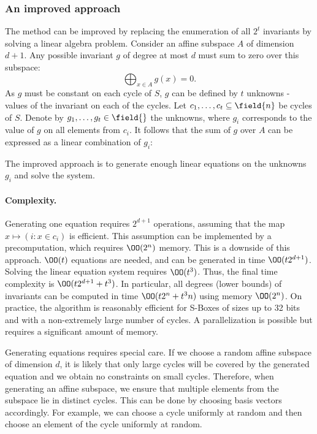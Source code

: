 \subsubsection{An improved approach}
The method can be improved by replacing the enumeration of all $2^t$ invariants by solving a linear algebra problem. Consider an affine subspace $A$ of dimension $d+1$. Any possible invariant $g$ of degree at most $d$ must sum to zero over this subspace:
$$
\bigoplus_{x \in A} g(x) = 0.
$$
As $g$ must be constant on each cycle of $S$, $g$ can be defined by $t$ unknowns - values of the invariant on each of the cycles. Let $c_1, \ldots, c_t \subseteq \field{n}$ be cycles of $S$. Denote by $g_1, \ldots, g_t \in \field{}$ the unknowns, where $g_i$ corresponds to the value of $g$ on all elements from $c_i$. It follows that the sum of $g$ over $A$ can be expressed as a linear combination of $g_i$:

The improved approach is to generate enough linear equations on the unknowns $g_i$ and solve the system.

\paragraph{Complexity.}
Generating one equation requires $2^{d+1}$ operations, assuming that the map $x \mapsto (i: x \in c_i)$ is efficient. This assumption can be implemented by a precomputation, which requires $\OO(2^n)$ memory. This is a downside of this approach. 
$\OO(t)$ equations are needed, and can be generated in time $\OO(t2^{d+1})$. Solving the linear equation system requires $\OO(t^3)$. Thus, the final time complexity is $\OO(t2^{d+1} + t^3)$. In particular, all degrees (lower bounds) of invariants can be computed in time $\OO(t2^n + t^3n)$ using memory $\OO(2^n)$. On practice, the algorithm is reasonably efficient for S-Boxes of sizes up to 32 bits and with a non-extremely large number of cycles. A parallelization is possible but requires a significant amount of memory.

\begin{remark}
Generating equations requires special care. If we choose a random affine subspace of dimension $d$, it is likely that only large cycles will be covered by the generated equation and we obtain no constraints on small cycles. Therefore, when generating an affine subspace, we ensure that multiple elements from the subspace lie in distinct cycles. This can be done by choosing basis vectors accordingly. For example, we can choose a cycle uniformly at random and then choose an element of the cycle uniformly at random.
\end{remark}

